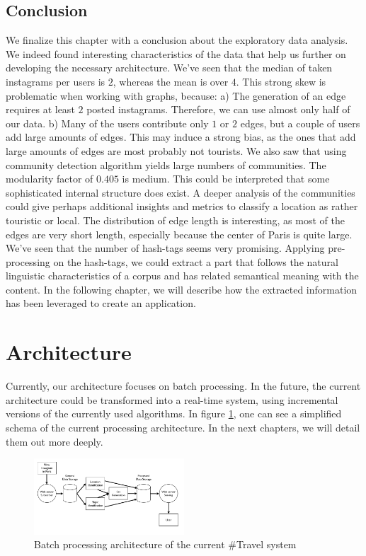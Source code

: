 \subsection{Conclusion}

We finalize this chapter with a conclusion about the exploratory data analysis. We indeed found  interesting characteristics of the data that help us further on developing the necessary architecture. We've seen that the median of taken instagrams per users is $2$, whereas the mean is over $4$. This strong skew is problematic when working with graphs, because: a) The generation of an edge requires at least $2$ posted instagrams. Therefore, we can use almost only half of our data. b) Many of the users contribute only $1$ or $2$ edges, but a couple of users add large amounts of edges. This may induce a strong bias, as the ones that add large amounts of edges are most probably not tourists. We also saw that using community detection algorithm yields large numbers of communities. The modularity factor of $0.405$ is medium. This could be interpreted that some sophisticated internal structure does exist. A deeper analysis of the communities could give perhaps additional insights and metrics to classify a location as rather touristic or local. The distribution of edge length is interesting, as most of the edges are very short length, especially because the center of Paris is quite large. We've seen that the number of hash-tags seems very promising. Applying pre-processing on the hash-tags, we could extract a part that follows the natural linguistic characteristics of a corpus and has related semantical meaning with the content. In the following chapter, we will describe how the extracted information has been leveraged to create an application.

\section{Architecture}

Currently, our architecture focuses on batch processing. In the future, the current architecture could be transformed into a real-time system, using incremental versions of the currently used algorithms. In figure \ref{fig:architecture}, one can see a simplified schema of the current processing architecture. In the next chapters, we will detail them out more deeply.

\begin{figure}[h!]
  \centering
    \includegraphics[width=0.5\textwidth]{images/architecture}
  \caption{Batch processing architecture of the current \#Travel system}
  \label{fig:architecture}
\end{figure}

